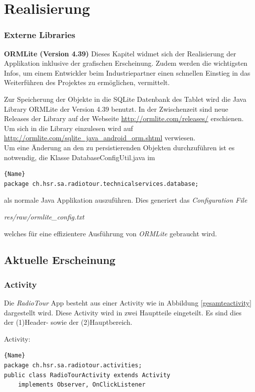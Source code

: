 \chapter{Realisierung}
\label{ref:realisierung}
\subsection{Externe Libraries}
\textbf{ORMLite (Version 4.39)}
Dieses Kapitel widmet sich der Realisierung der Applikation inklusive der grafischen Erscheinung. Zudem werden die wichtigsten Infos, um einem Entwickler beim Industriepartner einen schnellen Einstieg in das Weiterführen des Projektes zu ermöglichen, vermittelt.
 
Zur Speicherung der Objekte in die SQLite Datenbank des Tablet wird die Java Library ORMLite der Version 4.39 benutzt. In der Zwischenzeit sind neue Releases der Library auf der Webseite \url{http://ormlite.com/releases/} erschienen. Um sich in die Library einzulesen wird auf \url{http://ormlite.com/sqlite_java_android_orm.shtml} verwiesen.
\\
Um eine Änderung an den zu persistierenden Objekten durchzuführen ist es notwendig, die Klasse DatabaseConfigUtil.java im

\begin{lstlisting}{Name}
package ch.hsr.sa.radiotour.technicalservices.database;
\end{lstlisting}

als normale Java Applikation auszuführen. Dies generiert das \textit{Configuration File}

\textit{res/raw/ormlite\_config.txt}

welches für eine effizientere Ausführung von \textit{ORMLite} gebraucht wird.

\section{Aktuelle Erscheinung}
\subsection{Activity}

Die \textit{RadioTour} App besteht aus einer Activity wie in Abbildung \ref{gesamteactivity} dargestellt wird. Diese Activity wird in zwei Hauptteile eingeteilt. Es sind dies der (1)Header- sowie der (2)Hauptbereich. 

Activity:
\begin{lstlisting}{Name}
package ch.hsr.sa.radiotour.activities;
public class RadioTourActivity extends Activity 
	implements Observer, OnClickListener
\end{lstlisting}


